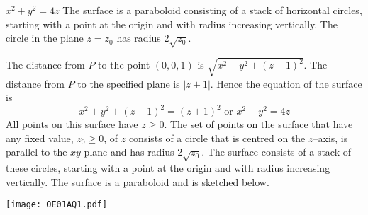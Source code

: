 \begin{answer}
$x^2+y^2=4z$
The surface is a paraboloid consisting of a stack of horizontal circles, starting with a point at the origin and with radius increasing vertically.
The circle in the plane $z=z_0$ has radius $2\sqrt{z_0}$.
\end{answer}

\begin{solution}
The distance from $P$ to the point $(0,0,1)$ is $\sqrt{x^2+y^2+(z-1)^2}$.
The distance from $P$ to the specified plane is $|z+1|$. Hence the equation
of the surface is
\begin{equation*}
x^2+y^2+(z-1)^2=(z+1)^2\text{ or }
   x^2+y^2=4z
\end{equation*}
All points on this surface have $z\ge 0$. The set of points on the surface
that have any fixed value, $z_0\ge 0$, of $z$ consists of a circle that is
centred on the $z$--axis, is parallel to the $xy$-plane and has radius
$2\sqrt{z_0}$. The surface consists of a stack of these circles, starting
with a point at the origin and with radius increasing vertically. The surface
is a paraboloid and is sketched below.
\begin{center}
     \texttt{[image: OE01AQ1.pdf]}
\end{center}
\end{solution}









